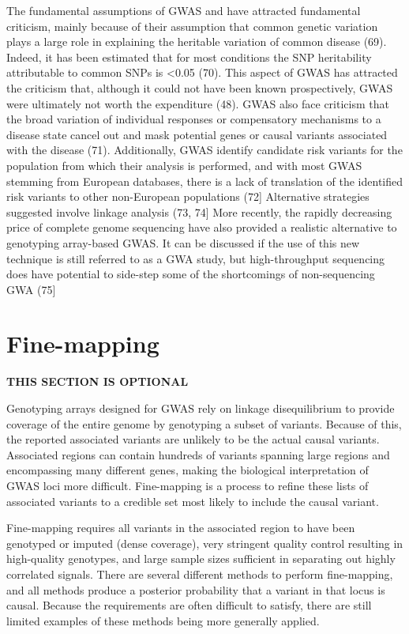 \documentclass[
]{book}
\begin{document}
The fundamental assumptions of GWAS and have attracted fundamental criticism, mainly because of their assumption that common genetic variation plays a large role in explaining the heritable variation of common disease (69). Indeed, it has been estimated that for most conditions the SNP heritability attributable to common SNPs is \textless0.05 (70). This aspect of GWAS has attracted the criticism that, although it could not have been known prospectively, GWAS were ultimately not worth the expenditure (48). GWAS also face criticism that the broad variation of individual responses or compensatory mechanisms to a disease state cancel out and mask potential genes or causal variants associated with the disease (71). Additionally, GWAS identify candidate risk variants for the population from which their analysis is performed, and with most GWAS stemming from European databases, there is a lack of translation of the identified risk variants to other non-European populations (72{]} Alternative strategies suggested involve linkage analysis (73, 74{]} More recently, the rapidly decreasing price of complete genome sequencing have also provided a realistic alternative to genotyping array-based GWAS. It can be discussed if the use of this new technique is still referred to as a GWA study, but high-throughput sequencing does have potential to side-step some of the shortcomings of non-sequencing GWA (75{]}

\hypertarget{fine-mapping}{%
\section{Fine-mapping}\label{fine-mapping}}

\textbf{THIS SECTION IS OPTIONAL}

Genotyping arrays designed for GWAS rely on linkage disequilibrium to provide coverage of the entire genome by genotyping a subset of variants. Because of this, the reported associated variants are unlikely to be the actual causal variants. Associated regions can contain hundreds of variants spanning large regions and encompassing many different genes, making the biological interpretation of GWAS loci more difficult. Fine-mapping is a process to refine these lists of associated variants to a credible set most likely to include the causal variant.

Fine-mapping requires all variants in the associated region to have been genotyped or imputed (dense coverage), very stringent quality control resulting in high-quality genotypes, and large sample sizes sufficient in separating out highly correlated signals. There are several different methods to perform fine-mapping, and all methods produce a posterior probability that a variant in that locus is causal. Because the requirements are often difficult to satisfy, there are still limited examples of these methods being more generally applied.
\end{document}
